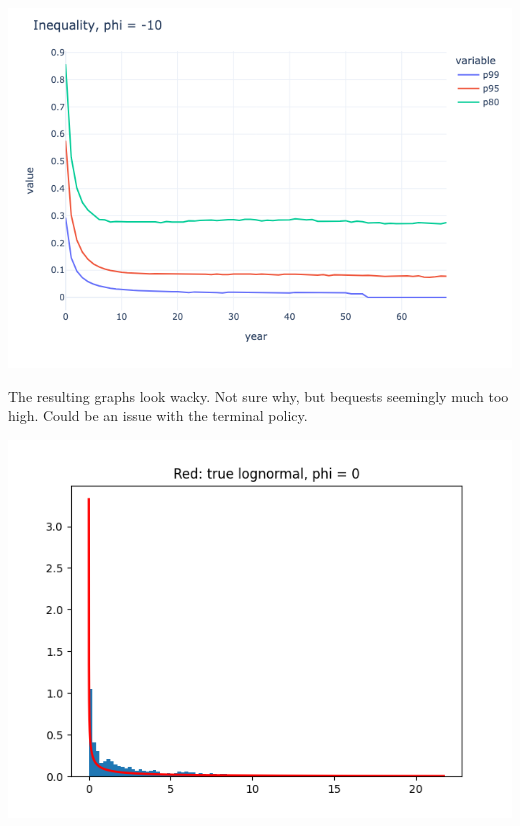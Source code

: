 \begin{questions}
\begin{solution}
\includegraphics[scale=0.5]{figures/inequality_-10_tax_15.png}

The resulting graphs look wacky. Not sure why, but bequests seemingly much too high. Could be an issue with the terminal policy.
\end{solution}

\begin{solution}
	\includegraphics[scale=0.5]{figures/kdensity_0_tax_15.png}
\end{solution}


\end{questions}
